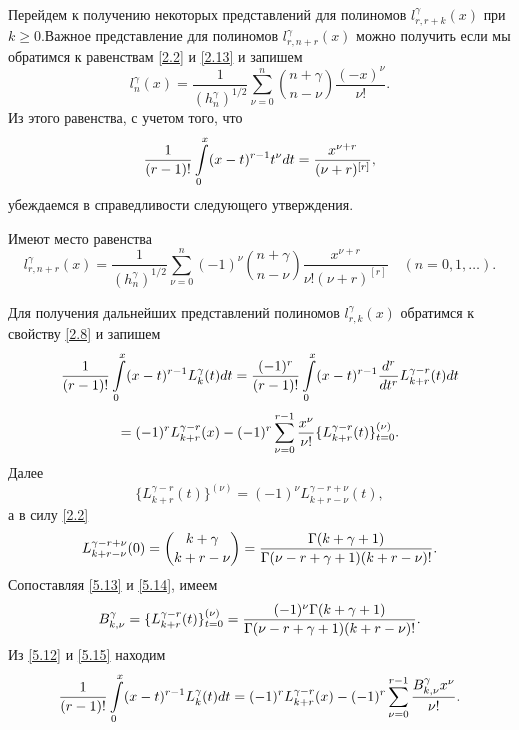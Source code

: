 Перейдем к получению некоторых  представлений для полиномов
$l_{r,r+k}^{\gamma}(x)$ при $k\ge0$.Важное представление для полиномов $l_{r,n+r}^{\gamma}(x)$ можно получить если мы обратимся к равенствам \eqref{2.2} и \eqref{2.13} и запишем
\begin{equation*}
l_n^\gamma(x) =\frac{1}{(h_n^\gamma)^{1/2}}
\sum\limits_{\nu=0}^{n}
\binom{n+\gamma}{n-\nu}
\frac{(-x)^\nu}{\nu!}.
\end{equation*}
Из этого равенства, с учетом того, что
\begin{equation*}
{1\over (r-1)!}\int\limits_{0}^x(x-t)^{r-1}t^\nu dt=\frac{x^{\nu+r}}{(\nu+r)^{[r]}},
\end{equation*}
убеждаемся в справедливости следующего утверждения.
\begin{theorem}
Имеют место равенства
\begin{equation*}
l_{r,n+r}^{\gamma}(x)=
\frac{1}{(h_n^\gamma)^{1/2}}
\sum\limits_{\nu=0}^{n}(-1)^\nu \binom{n+\gamma}{n-\nu}
\frac{x^{\nu+r}}{\nu!(\nu+r)^{[r]}}\quad (n=0,1,\ldots).
\end{equation*}
\end{theorem}
Для получения дальнейших представлений полиномов $l_{r,k}^{\gamma}(x)$ обратимся  к свойству \eqref{2.8} и запишем
 $$
 {1\over
(r-1)!}\int\limits_{0}^x(x-t)^{r-1}
     L^\gamma_k(t)dt=
{(-1)^r\over (r-1)!}\int\limits_{0}^x(x-t)^{r-1}
{d^r\over dt^r}L_{k+r}^{\gamma-r}(t)dt
     $$
 \begin{equation}\label{5.12}
 =(-1)^rL_{k+r}^{\gamma-r}(x)-(-1)^r\sum_{\nu=0}^{r-1}
{x^\nu\over\nu!}\{L_{k+r}^{\gamma-r}(t)\}_{t=0}^{(\nu)}.
 \end{equation}
Далее
\begin{equation}\label{5.13}
 \{L_{k+r}^{\gamma-r}(t)\}^{(\nu)}=(-1)^\nu
L_{k+r-\nu}^{\gamma-r+\nu}(t),
  \end{equation}
 а в силу \eqref{2.2}
 \begin{equation}\label{5.14}
L_{k+r-\nu}^{\gamma-r+\nu}(0)= {k+\gamma\choose
k+r-\nu}={\Gamma(k+\gamma+1)\over\Gamma(\nu-r+
\gamma+1)(k+r-\nu)!}.
\end{equation}
Сопоставляя \eqref{5.13} и \eqref{5.14}, имеем
\begin{equation}\label{5.15}
B_{k,\nu}^\gamma=\{L_{k+r}^{\gamma-r}(t)\}^{(\nu)}_{t=0}=
{(-1)^\nu\Gamma(k+\gamma+1)\over\Gamma(\nu-r+ \gamma+1)(k+r-\nu)!}.
\end{equation}
Из \eqref{5.12} и \eqref{5.15} находим
\begin{equation}\label{5.16}
{1\over (r-1)!}\int\limits_{0}^x(x-t)^{r-1}
 L^\gamma_k(t)dt=
(-1)^rL_{k+r}^{\gamma-r}(x)-
     (-1)^r\sum_{\nu=0}^{r-1}
{B_{k,\nu}^\gamma x^\nu\over\nu!}.
\end{equation}
